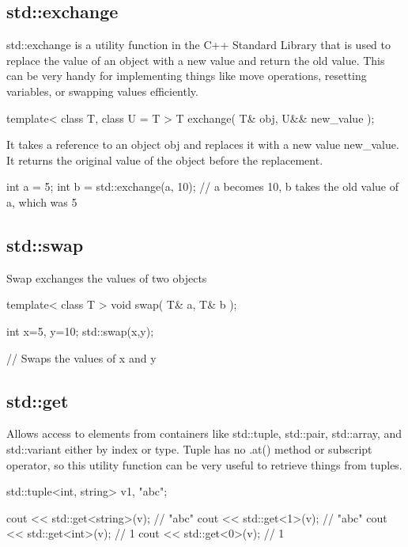 \documentclass{report}
\begin{document}
     \subsection{std::exchange}
     \bigbreak \noindent 
     std::exchange is a utility function in the C++ Standard Library that is used to replace the value of an object with a new value and return the old value. This can be very handy for implementing things like move operations, resetting variables, or swapping values efficiently.
     \bigbreak \noindent 
     \begin{cppcode}
         template< class T, class U = T >
         T exchange( T& obj, U&& new_value );
     \end{cppcode}
     \bigbreak \noindent 
     It takes a reference to an object obj and replaces it with a new value new\_value. It returns the original value of the object before the replacement.
     \bigbreak \noindent 
     \begin{cppcode}
         int a = 5;
        int b = std::exchange(a, 10); // a becomes 10, b takes the old value of a, which was 5
     \end{cppcode}

     \pagebreak 
     \subsection{std::swap}
     \bigbreak \noindent 
     Swap exchanges the values of two objects
     \bigbreak \noindent 
     \begin{cppcode}
         template< class T >
         void swap( T& a, T& b );
     \end{cppcode}
     \bigbreak \noindent 
     \begin{cppcode}
     int x=5, y=10;
     std::swap(x,y);

     // Swaps the values of x and y
     \end{cppcode}

     \pagebreak 
     \subsection{std::get}
     \bigbreak \noindent 
     Allows access to elements from containers like std::tuple, std::pair, std::array, and std::variant either by index or type.
     \bigbreak \noindent 
     Tuple has no .at() method or subscript operator, so this utility function can be very useful to retrieve things from tuples.

     \bigbreak \noindent 
     \begin{cppcode}
         std::tuple<int, string> v{1, "abc"};

         cout << std::get<string>(v); // "abc"
         cout << std::get<1>(v); // "abc"
         cout << std::get<int>(v); // 1
         cout << std::get<0>(v); // 1
     \end{cppcode}
\end{document}
